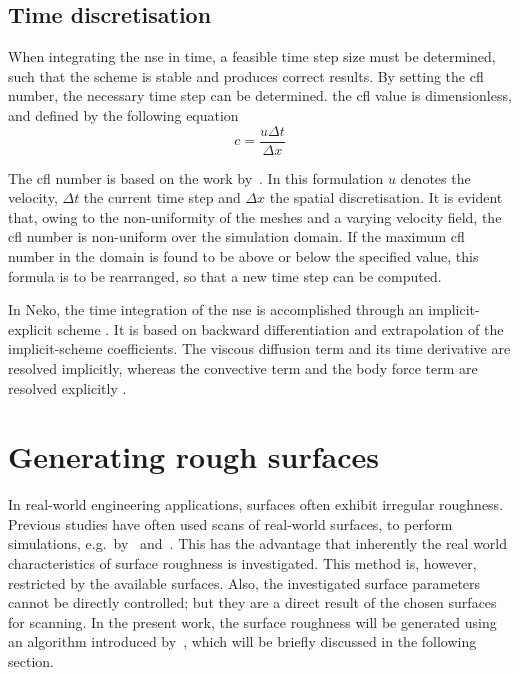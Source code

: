 \subsection{Time discretisation}\label{subsec: time discretization}

When integrating the \acrshort{nse} in  time, a feasible time step size must be determined, such that the scheme is stable and produces correct results.
By setting the \acrfull{cfl} number, the necessary time step can be determined.
the  \acrfull{cfl} value is  dimensionless, and defined  by the following equation
\begin{equation}\label{eq: cfl number}
    c = \frac{u\Delta t}{\Delta x}
\end{equation}

The \acrfull{cfl} number is based on the work by~\cite{courantBerPartiellenDifferenzengleiehungen}.
In this formulation $u$ denotes the velocity, $\Delta t$ the current time step and $\Delta x$ the spatial discretisation.
It is evident that, owing to the non-uniformity of the  meshes and a varying velocity field, the \acrshort{cfl} number is non-uniform over the simulation domain.
If the maximum \acrshort{cfl} number in the domain is found to be  above or below the specified value, this formula is to be rearranged, so that a new time step can be computed.

In Neko, the time integration of the \acrshort{nse} is accomplished through  an implicit-explicit scheme \citep{janssonNekoModernPortable2024}.
It is based on backward differentiation and extrapolation of the implicit-scheme coefficients.
The viscous diffusion term and its time derivative are resolved implicitly, whereas the convective term and the body force term are resolved explicitly \citep{janssonNekoModernPortable2024}.

\section{Generating rough surfaces}\label{sec:generating rough surfaces}
In real-world engineering applications, surfaces often exhibit irregular roughness.
Previous studies have often used scans of real-world surfaces, to perform simulations, e.g.\ by~\cite{thakkarInvestigationTurbulentFlow2017, demaioDirectNumericalSimulation2023} and~\cite{busseReynoldsnumberDependenceNearwall2017}.
This has the advantage that inherently the real world characteristics of surface roughness is investigated.
This method is, however, restricted by the available surfaces.
Also, the investigated surface parameters cannot be directly controlled; but they are a direct result of the chosen surfaces for scanning.
In the present work, the surface roughness will be generated using an algorithm introduced by~\cite{perez-rafolsGeneratingRandomlyRough2019}, which will be briefly discussed in the following section.


